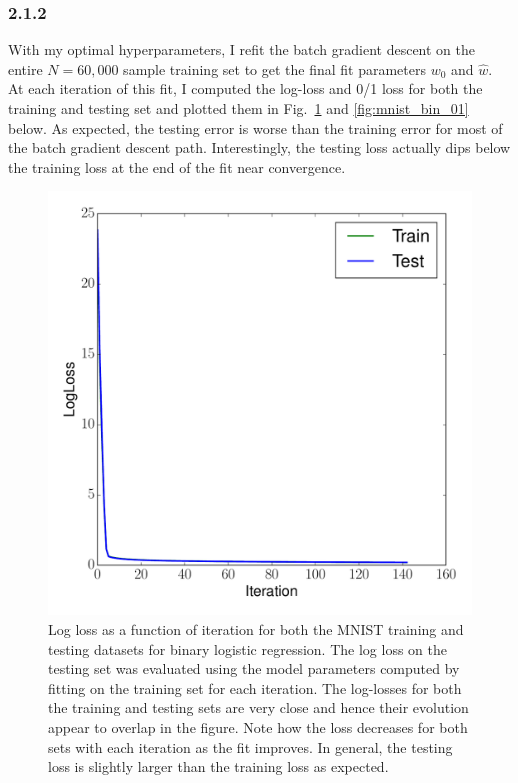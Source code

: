 \documentclass[12pt]{amsart}
\begin{document}
\subsubsection*{2.1.2}
With my optimal hyperparameters, I refit the batch gradient descent on the entire $N = 60,000$ sample training set to get the final fit parameters $w_0$ and $\hat{w}$.  At each iteration of this fit, I computed the log-loss and 0/1 loss for both the training and testing set and plotted them in Fig.~\ref{fig:mnist_bin_ll} and \ref{fig:mnist_bin_01} below.  As expected, the testing error is worse than the training error for most of the batch gradient descent path.  Interestingly, the testing loss actually dips below the training loss at the end of the fit near convergence.
\begin{figure}[H]
	\includegraphics[width=\columnwidth]{mnist_bin_train_test_ll.pdf}
    \caption{Log loss as a function of iteration for both the MNIST training and testing datasets for binary logistic regression.  The log loss on the testing set was evaluated using the model parameters computed by fitting on the training set for each iteration.  The log-losses for both the training and testing sets are very close and hence their evolution appear to overlap in the figure. Note how the loss decreases for both sets with each iteration as the fit improves.  In general, the testing loss is slightly larger than the training loss as expected.}
    \label{fig:mnist_bin_ll}
\end{figure}
\end{document}
